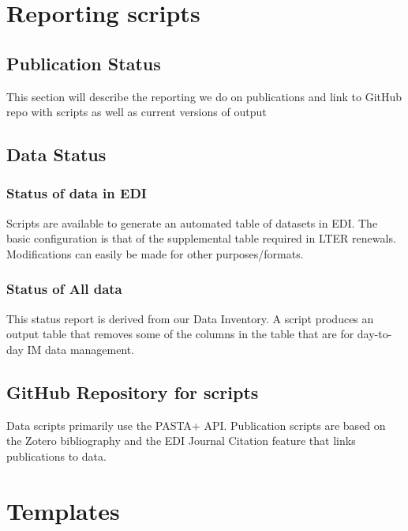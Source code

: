 \documentclass[
  letterpaper,
  DIV=11,
  numbers=noendperiod]{scrreprt}
\begin{document}

\chapter{Reporting scripts}\label{reporting-scripts}

\section{Publication Status}\label{publication-status}

This section will describe the reporting we do on publications and link
to GitHub repo with scripts as well as current versions of output

\section{Data Status}\label{data-status}

\subsection{Status of data in EDI}\label{status-of-data-in-edi}

Scripts are available to generate an automated table of datasets in EDI.
The basic configuration is that of the supplemental table required in
LTER renewals. Modifications can easily be made for other
purposes/formats.

\subsection{Status of All data}\label{status-of-all-data}

This status report is derived from our Data Inventory. A script produces
an output table that removes some of the columns in the table that are
for day-to-day IM data management.

\section{GitHub Repository for
scripts}\label{github-repository-for-scripts}

Data scripts primarily use the PASTA+ API. Publication scripts are based
on the Zotero bibliography and the EDI Journal Citation feature that
links publications to data.


\chapter{Templates}\label{templates}
\end{document}
